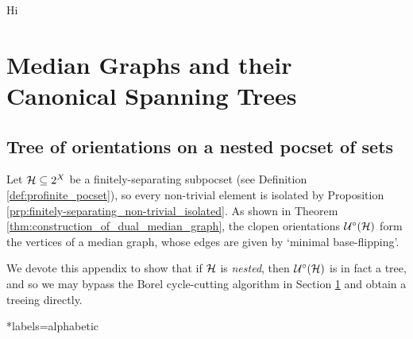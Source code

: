 \documentclass{amsart}
\begin{document}
    Hi

    \section{Median Graphs and their Canonical Spanning Trees}\label{sec:spanning_trees_of_median_graphs_with_finite_hyperplanes}

    {\color{red}{TODO}}

    \begin{appendices}
        \section{Tree of orientations on a nested pocset of sets}

        Let $\mathcal{H}\subseteq2^X$ be a finitely-separating subpocset (see Definition \ref{def:profinite_pocset}), so every non-trivial element is isolated by Proposition \ref{prp:finitely-separating_non-trivial_isolated}. As shown in Theorem \ref{thm:construction_of_dual_median_graph}, the clopen orientations $\mathcal{U}^\circ(\mathcal{H})$ form the vertices of a median graph, whose edges are given by `minimal base-flipping'.

        We devote this appendix to show that if $\mathcal{H}$ is \textit{nested}, then $\mathcal{U}^\circ(\mathcal{H})$ is in fact a tree, and so we may bypass the Borel cycle-cutting algorithm in Section \ref{sec:spanning_trees_of_median_graphs_with_finite_hyperplanes} and obtain a treeing directly.
    \end{appendices}

    \begin{bibdiv}
        \begin{biblist}*{labels={alphabetic}}
        \end{biblist}
    \end{bibdiv}
\end{document}
